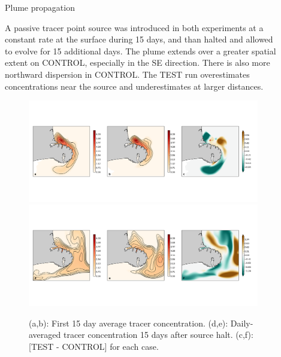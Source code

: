 \documentclass[final]{beamer}
\newlength{\sepwid}
\newlength{\onecolwid}
\newlength{\twocolwid}
\begin{document}
\begin{frame}[t]
\begin{columns}[t]
\begin{column}{\twocolwid}
\begin{block}
    \end{block}


\end{column} %

\begin{column}{\sepwid}\end{column} %

\begin{column}{\onecolwid} %

    \begin{block}{Plume propagation}

    A passive tracer point source was introduced in both experiments at a constant rate at the surface during 15 days, and than halted and allowed to evolve for 15 additional days. The plume extends over a greater spatial extent on CONTROL, especially in the SE direction. There is also more northward dispersion in CONTROL. The TEST run overestimates concentrations near the source and underestimates at larger distances. 

    \begin{figure}
    \includegraphics[width=0.8\linewidth]{dye_concentration.png}\\
    \includegraphics[width=0.8\linewidth]{dye_concentration_last-day.png}
    \caption{\label{dye} (a,b): First 15 day average tracer concentration. (d,e): Daily-averaged tracer concentration 15 days after source halt. (c,f): [TEST - CONTROL] for each case. }
    \end{figure}


\end{block}
\end{column}
\end{columns}
\end{frame}
\end{document}

